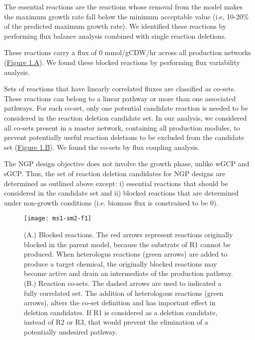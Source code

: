 	 The essential reactions are the reactions whose removal from the model makes the maximum growth rate fall below the minimum acceptable value (i.e, 10-20\% of the predicted maximum growth rate). We identified these reactions by performing flux balance analysis combined with single reaction deletions.

	 These reactions carry a flux of 0 mmol/gCDW/hr across all production networks  (\hyperref[fig:candidaterxn]{Figure \ref{fig:candidaterxn}.A}).  We found these blocked reactions by performing flux variability analysis.

	 Sets of reactions that have linearly correlated fluxes are classified as co-sets. These reactions can belong to a linear pathway or more than one associated pathways. For each co-set, only one potential candidate reaction is needed to be considered in the reaction deletion candidate set. In our analysis, we considered all co-sets present in a master network, containing all production modules, to prevent potentially useful reaction deletions to be excluded from the candidate set (\hyperref[fig:candidaterxn]{Figure \ref{fig:candidaterxn}.B}). We found the co-sets by flux coupling analysis.

	 The NGP design objective does not involve the growth phase, unlike wGCP and sGCP. Thus, the set of reaction deletion candidates for NGP designs are determined as outlined above except: i) essential reactions that should be considered in the candidate set and ii) blocked reactions that are determined under non-growth conditions (i.e. biomass flux is constrained to be 0).

\begin{figure}[ht]
    \texttt{[image: ms1-sm2-f1]}
    \caption[Blocked and co-set reactions in deletion candidate determination]{(A.) Blocked reactions. The red arrows represent reactions originally blocked in the parent model, because the substrate of R1 cannot be produced. When heterologus reactions (green arrows) are added to produce a target chemical, the originally blocked reactions may become active and drain an intermediate of the production pathway. (B.) Reaction co-sets. The dashed arrows are used to indicated a fully correlated set. The addition of heterologous reactions (green arrows), alters the co-set definition and has important effect in deletion candidates. If R1 is considered as a deletion candidate, instead of R2 or R3, that would prevent the elimination of a potentially undesired pathway.}
\label{fig:candidaterxn}
\end{figure}

